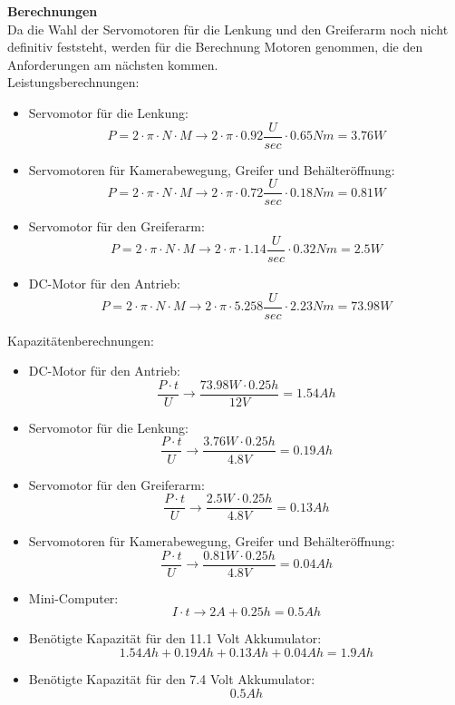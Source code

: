 \textbf{Berechnungen}\\[0.2cm]
Da die Wahl der Servomotoren für die Lenkung und den Greiferarm noch nicht definitiv feststeht, werden für die Berechnung Motoren genommen, die den Anforderungen am nächsten kommen.\\
Leistungsberechnungen:
\begin{itemize}
\item Servomotor für die Lenkung:
\[
P=2\cdot \pi\cdot N\cdot M \to 2\cdot \pi\cdot 0.92\frac{U}{sec}\cdot 0.65Nm = 3.76W
\]
\item Servomotoren für Kamerabewegung, Greifer und Behälteröffnung:
\[
P=2\cdot \pi\cdot N\cdot M \to 2\cdot \pi\cdot 0.72\frac{U}{sec}\cdot 0.18Nm = 0.81W
\]
\item Servomotor für den Greiferarm:
\[
P=2\cdot \pi\cdot N\cdot M \to 2\cdot \pi\cdot 1.14\frac{U}{sec}\cdot 0.32Nm = 2.5W
\]
\item DC-Motor für den Antrieb:
\[
P=2\cdot \pi\cdot N\cdot M \to 2\cdot \pi\cdot 5.258\frac{U}{sec}\cdot 2.23Nm = 73.98W
\]
\end{itemize}
Kapazitätenberechnungen:
\begin{itemize}
\item DC-Motor für den Antrieb:
\[
\frac{P\cdot t}{U} \to \frac{73.98W\cdot0.25h}{12V}= 1.54 Ah
\]
\item Servomotor für die Lenkung:
\[
\frac{P\cdot t}{U} \to \frac{3.76W\cdot0.25h}{4.8V}= 0.19 Ah
\]
\item Servomotor für den Greiferarm:
\[
\frac{P\cdot t}{U} \to \frac{2.5W\cdot0.25h}{4.8V}= 0.13 Ah
\]
\item Servomotoren für Kamerabewegung, Greifer und Behälteröffnung:
\[
\frac{P\cdot t}{U} \to \frac{0.81W\cdot0.25h}{4.8V}= 0.04 Ah
\]
\item Mini-Computer:
\[
I\cdot t \to 2A+0.25h = 0.5 Ah
\]
\item Benötigte Kapazität für den 11.1 Volt Akkumulator:
\[
1.54Ah+0.19Ah+0.13Ah+0.04Ah = 1.9Ah
\]
\item Benötigte Kapazität für den 7.4 Volt Akkumulator:
\[
0.5Ah
\]
\end{itemize}
